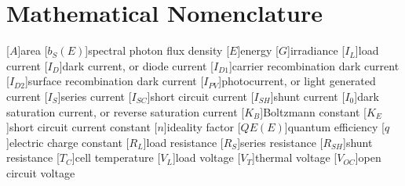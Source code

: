 \chapter{Mathematical Nomenclature}\label{appendix:math_nomenclature}

\begin{acronym}
    [$A$]{area}
    [$b_S(E)$]{spectral photon flux density}
    [$E$]{energy}
    [$G$]{irradiance}
    [$I_L$]{load current}
    [$I_D$]{dark current, or diode current}
    [$I_{D1}$]{carrier recombination dark current}
    [$I_{D2}$]{surface recombination dark current}
    [$I_{PV}$]{photocurrent, or light generated current}
    [$I_S$]{series current}
    [$I_{SC}$]{short circuit current}
    [$I_{SH}$]{shunt current}
    [$I_0$]{dark saturation current, or reverse saturation current}
    [$K_B$]{Boltzmann constant}
    [$K_E$]{short circuit current constant}
    [$n$]{ideality factor}
    [$QE(E)$]{quantum efficiency}
    [$q$]{electric charge constant}
    [$R_L$]{load resistance}
    [$R_S$]{series resistance}
    [$R_{SH}$]{shunt resistance}
    [$T_C$]{cell temperature}
    [$V_L$]{load voltage}
    [$V_T$]{thermal voltage}
    [$V_{OC}$]{open circuit voltage}
\end{acronym}